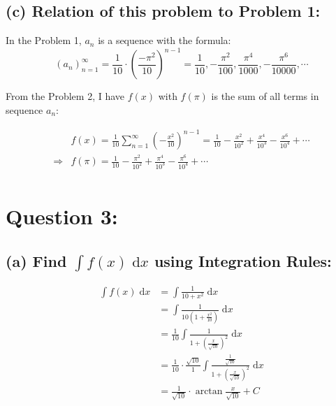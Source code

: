 \documentclass[12pt]{article}
\begin{document}
\subsection*{(c) Relation of this problem to Problem 1:}
\noindent In the Problem 1, $a_n$ is a sequence with the formula: $$\displaystyle (a_n)_{n=1}^{\infty} = \frac{1}{10}\cdot \left(\frac{-\pi^2}{10} \right)^{n-1}= 
\frac{1}{10},-\frac{\pi^2}{100},\frac{\pi^4}{1000},-\frac{\pi^6}{10000}, \cdots $$


\noindent From the Problem 2, I have $f(x)$ with $f(\pi)$ is the sum of all terms in sequence $a_n$:

\begin{align*}
    & f(x)=\frac{1}{10} \sum_{n=1}^\infty \left(- \frac{x^2}{10} \right)^{n-1}= \frac{1}{10}
    - \frac{x^2}{10^2}
    + \frac{x^4}{10^3}
    - \frac{x^6}{10^4}
    + \cdots\\
    \Longrightarrow
    & f(\pi)= \frac{1}{10}
    - \frac{\pi^2}{10^2}
    + \frac{\pi^4}{10^3}
    - \frac{\pi^6}{10^4}
    + \cdots\\
\end{align*}









    
    
\newpage
\section*{Question 3:}
\subsection*{(a) Find ${\displaystyle \int f(x) \;\mathrm{d}x}$ using Integration Rules:}
\begin{align*}
    \int f(x) \;\mathrm{d}x &= \int \frac{1}{10+x^2} \;\mathrm{d}x\\
    &= \int \frac{1}{10\left(1+ \frac{x^2}{10} \right)} \;\mathrm{d}x\\
    &= \frac{1}{10} \int \frac{1}{1+ \left(\frac{x}{\sqrt{10}} \right)^2} \;\mathrm{d}x\\
    &= \frac{1}{10}\cdot \frac{\sqrt{10}}{1} \int \frac{\frac{1}{\sqrt{10}}}{1+ \left(\frac{x}{\sqrt{10}} \right)^2} \;\mathrm{d}x\\
    &= \frac{1}{\sqrt{10}}\cdot \arctan{\frac{x}{\sqrt{10}}} +C \\
\end{align*}
\end{document}
